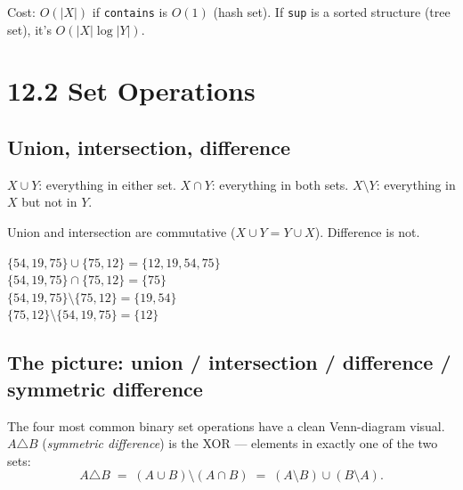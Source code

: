 \documentclass[11pt]{article}
\begin{document}
Cost: $O(|X|)$ if \texttt{contains} is $O(1)$ (hash set). If \texttt{sup} is a sorted structure (tree set), it's $O(|X| \log |Y|)$.

\section{12.2 Set Operations}

\subsection*{Union, intersection, difference}

\begin{defnbox}
$X \cup Y$: everything in either set.
$X \cap Y$: everything in both sets.
$X \setminus Y$: everything in $X$ but not in $Y$.
\end{defnbox}

Union and intersection are commutative ($X \cup Y = Y \cup X$). Difference is not.

\begin{examplebox}
$\{54, 19, 75\} \cup \{75, 12\} = \{12, 19, 54, 75\}$ \\
$\{54, 19, 75\} \cap \{75, 12\} = \{75\}$ \\
$\{54, 19, 75\} \setminus \{75, 12\} = \{19, 54\}$ \\
$\{75, 12\} \setminus \{54, 19, 75\} = \{12\}$
\end{examplebox}

\subsection*{The picture: union / intersection / difference / symmetric difference}

The four most common binary set operations have a clean Venn-diagram
visual. $A \triangle B$ (\emph{symmetric difference}) is the XOR ---
elements in exactly one of the two sets:
\[
A \triangle B \;=\; (A \cup B) \setminus (A \cap B)
\;=\; (A \setminus B) \cup (B \setminus A).
\]
\end{document}
